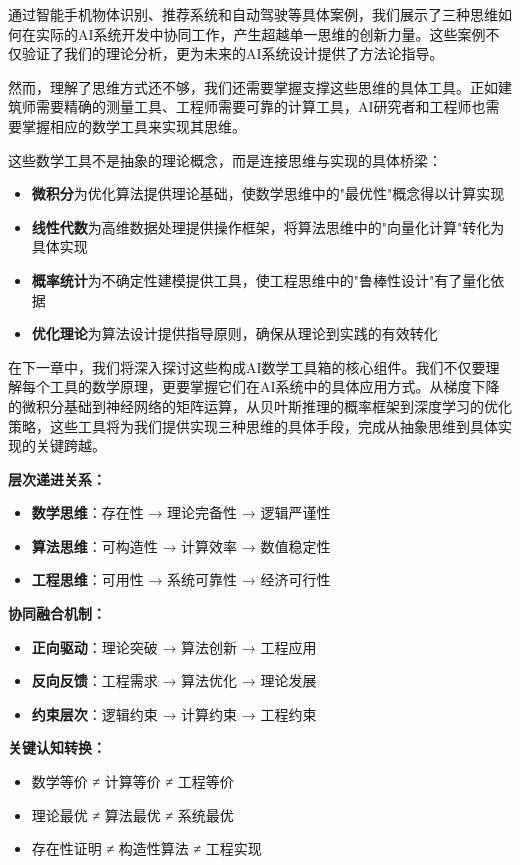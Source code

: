 通过智能手机物体识别、推荐系统和自动驾驶等具体案例，我们展示了三种思维如何在实际的AI系统开发中协同工作，产生超越单一思维的创新力量。这些案例不仅验证了我们的理论分析，更为未来的AI系统设计提供了方法论指导。

然而，理解了思维方式还不够，我们还需要掌握支撑这些思维的具体工具。正如建筑师需要精确的测量工具、工程师需要可靠的计算工具，AI研究者和工程师也需要掌握相应的数学工具来实现其思维。

这些数学工具不是抽象的理论概念，而是连接思维与实现的具体桥梁：
\begin{itemize}
\item \textbf{微积分}为优化算法提供理论基础，使数学思维中的"最优性"概念得以计算实现
\item \textbf{线性代数}为高维数据处理提供操作框架，将算法思维中的"向量化计算"转化为具体实现
\item \textbf{概率统计}为不确定性建模提供工具，使工程思维中的"鲁棒性设计"有了量化依据
\item \textbf{优化理论}为算法设计提供指导原则，确保从理论到实践的有效转化
\end{itemize}

在下一章中，我们将深入探讨这些构成AI数学工具箱的核心组件。我们不仅要理解每个工具的数学原理，更要掌握它们在AI系统中的具体应用方式。从梯度下降的微积分基础到神经网络的矩阵运算，从贝叶斯推理的概率框架到深度学习的优化策略，这些工具将为我们提供实现三种思维的具体手段，完成从抽象思维到具体实现的关键跨越。

\begin{tcolorbox}[colback=blue!5!white,colframe=blue!75!black,title=核心要点：三种思维的层次递进与协同融合]
\textbf{层次递进关系：}
\begin{itemize}
\item \textbf{数学思维}：存在性 → 理论完备性 → 逻辑严谨性
\item \textbf{算法思维}：可构造性 → 计算效率 → 数值稳定性  
\item \textbf{工程思维}：可用性 → 系统可靠性 → 经济可行性
\end{itemize}

\textbf{协同融合机制：}
\begin{itemize}
\item \textbf{正向驱动}：理论突破 → 算法创新 → 工程应用
\item \textbf{反向反馈}：工程需求 → 算法优化 → 理论发展
\item \textbf{约束层次}：逻辑约束 → 计算约束 → 工程约束
\end{itemize}

\textbf{关键认知转换：}
\begin{itemize}
\item 数学等价 ≠ 计算等价 ≠ 工程等价
\item 理论最优 ≠ 算法最优 ≠ 系统最优
\item 存在性证明 ≠ 构造性算法 ≠ 工程实现
\end{itemize}
\end{tcolorbox}
